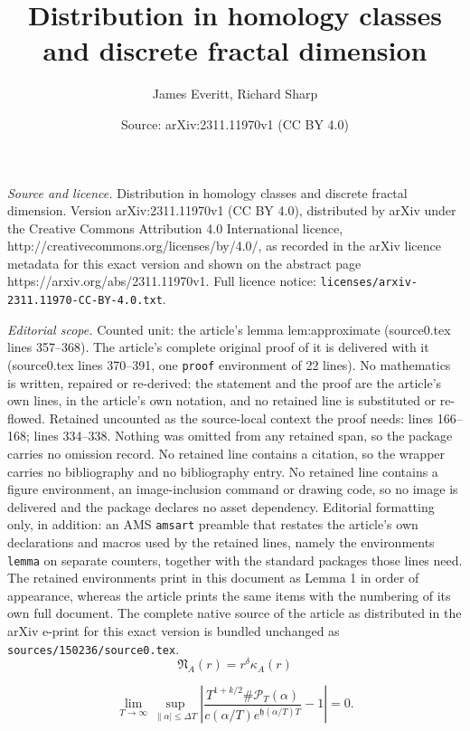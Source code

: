 \documentclass[10pt,a4paper]{amsart}
\title{Distribution in homology classes and discrete fractal dimension}
\author{James Everitt, Richard Sharp}
\date{Source: arXiv:2311.11970v1 (CC BY 4.0)}
\begin{document}
\maketitle

\noindent\emph{Source and licence.} Distribution in homology classes and discrete fractal dimension. Version arXiv:2311.11970v1 (CC BY 4.0), distributed by arXiv under the Creative Commons Attribution 4.0 International licence, http://creativecommons.org/licenses/by/4.0/, as recorded in the arXiv licence metadata for this exact version and shown on the abstract page https://arxiv.org/abs/2311.11970v1. Full licence notice: \texttt{licenses/arxiv-2311.11970-CC-BY-4.0.txt}.\par\smallskip

\noindent\textit{Editorial scope.} Counted unit: the article's lemma lem:approximate (source0.tex lines 357--368). The article's complete original proof of it is delivered with it (source0.tex lines 370--391, one \texttt{proof} environment of 22 lines). No mathematics is written, repaired or re-derived: the statement and the proof are the article's own lines, in the article's own notation, and no retained line is substituted or re-flowed.  Retained uncounted as the source-local context the proof needs: lines 166--168; lines 334--338.  Nothing was omitted from any retained span, so the package carries no omission record.  No retained line contains a citation, so the wrapper carries no bibliography and no bibliography entry.  No retained line contains a figure environment, an image-inclusion command or drawing code, so no image is delivered and the package declares no asset dependency.  Editorial formatting only, in addition: an AMS \texttt{amsart} preamble that restates the article's own declarations and macros used by the retained lines, namely the environments \texttt{lemma} on separate counters, together with the standard packages those lines need.  The retained environments print in this document as Lemma 1 in order of appearance, whereas the article prints the same items with the numbering of its own full document.  The complete native source of the article as distributed in the arXiv e-print for this exact version is bundled unchanged as \texttt{sources/150236/source0.tex}.
\begin{equation}\label{eq:def_of_kappa}
\mathfrak N_A(r) =  r^{\delta}\kappa_A(r)
\end{equation}

 \begin{equation}\label{eqn:uniform_asymp}
 \lim_{T \to \infty} \sup_{\|\alpha| \le \Delta T}
 \left|\frac{T^{1+k/2}\#\mathscr P_T(\alpha)}{c(\alpha/T)e^{\mathfrak h(\alpha/T)T}}
 -1 \right|=0.
 \end{equation}
\end{document}
